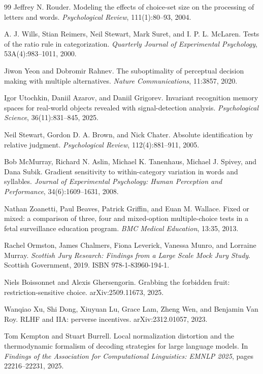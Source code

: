 \documentclass[11pt]{article}
\begin{document}
\begin{thebibliography}{99}
Jeffrey N. Rouder.
Modeling the effects of choice-set size on the processing of letters and words.
\emph{Psychological Review}, 111(1):80--93, 2004.

A. J. Wills, Stian Reimers, Neil Stewart, Mark Suret, and I. P. L. McLaren.
Tests of the ratio rule in categorization.
\emph{Quarterly Journal of Experimental Psychology}, 53A(4):983--1011, 2000.

Jiwon Yeon and Dobromir Rahnev.
The suboptimality of perceptual decision making with multiple alternatives.
\emph{Nature Communications}, 11:3857, 2020.

Igor Utochkin, Daniil Azarov, and Daniil Grigorev.
Invariant recognition memory spaces for real-world objects revealed with signal-detection
analysis.
\emph{Psychological Science}, 36(11):831--845, 2025.

Neil Stewart, Gordon D. A. Brown, and Nick Chater.
Absolute identification by relative judgment.
\emph{Psychological Review}, 112(4):881--911, 2005.

Bob McMurray, Richard N. Aslin, Michael K. Tanenhaus, Michael J. Spivey, and Dana Subik.
Gradient sensitivity to within-category variation in words and syllables.
\emph{Journal of Experimental Psychology: Human Perception and Performance},
34(6):1609--1631, 2008.

Nathan Zoanetti, Paul Beaves, Patrick Griffin, and Euan M. Wallace.
Fixed or mixed: a comparison of three, four and mixed-option multiple-choice tests in a
fetal surveillance education program.
\emph{BMC Medical Education}, 13:35, 2013.

Rachel Ormston, James Chalmers, Fiona Leverick, Vanessa Munro, and Lorraine Murray.
\emph{Scottish Jury Research: Findings from a Large Scale Mock Jury Study}.
Scottish Government, 2019. ISBN 978-1-83960-194-1.

Niels Boissonnet and Alexis Ghersengorin.
Grabbing the forbidden fruit: restriction-sensitive choice.
arXiv:2509.11673, 2025.

Wanqiao Xu, Shi Dong, Xiuyuan Lu, Grace Lam, Zheng Wen, and Benjamin Van Roy.
RLHF and IIA: perverse incentives.
arXiv:2312.01057, 2023.

Tom Kempton and Stuart Burrell.
Local normalization distortion and the thermodynamic formalism of decoding strategies for
large language models.
In \emph{Findings of the Association for Computational Linguistics: EMNLP 2025}, pages
22216--22231, 2025.


\end{thebibliography}
\end{document}

